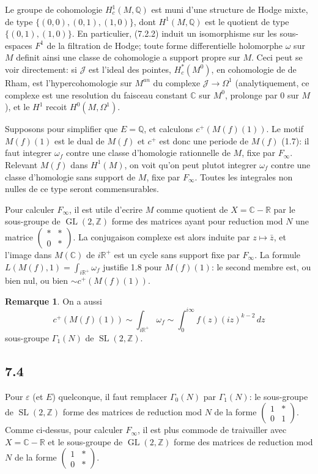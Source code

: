 \documentclass[12pt,a4paper]{article}
\theoremstyle{plain}
\theoremstyle{definition}
\newtheorem{remark}[definition]{Remarque}
\theoremstyle{remark}
\DeclareMathOperator{\GL}{GL}
\DeclareMathOperator{\SL}{SL}
\newcommand{\Q}{\mathbb{Q}}
\newcommand{\R}{\mathbb{R}}
\newcommand{\C}{\mathbb{C}}
\newcommand{\Z}{\mathbb{Z}}
\begin{document}
Le groupe de cohomologie $H^1_c(M, \Q)$ est muni d'une structure de Hodge mixte,
de type $\{(0,0), (0,1), (1,0)\}$, dont $H^1(M, \Q)$ est le quotient de type
$\{(0,1), (1,0)\}$. En particulier, (7.2.2) induit un isomorphisme sur les sous-espaces
$F^1$ de la filtration de Hodge; toute forme differentielle holomorphe $\omega$ sur $M$ definit
ainsi une classe de cohomologie a support propre sur $M$. Ceci peut se voir
directement: si $\mathcal{J}$ est l'ideal des pointes, $H_c^*(M^0)$, en cohomologie de de Rham,
est l'hypercohomologie sur $M^{an}$ du complexe $\mathcal{J} \to \Omega^1$ (analytiquement, ce complexe
est une resolution du faisceau constant $\C$ sur $M^0$, prolonge par 0 sur $M$), et le
$H^1$ recoit $H^0(M, \Omega^1)$.

Supposons pour simplifier que $E = \Q$, et calculons $c^+(M(f)(1))$. Le motif $M(f)(1)$
est le dual de $M(f)$ et $c^+$ est donc une periode de $M(f)$ (1.7): il faut integrer
$\omega_f$ contre une classe d'homologie rationnelle de $M$, fixe par $F_\infty$. Relevant
$M(f)$ dans $H^1(M)$, on voit qu'on peut plutot integrer $\omega_f$ contre une classe
d'homologie sans support de $M$, fixe par $F_\infty$. Toutes les integrales non nulles de
ce type seront commensurables.

Pour calculer $F_\infty$, il est utile d'ecrire $M$ comme quotient de
$X = \C - \R$ par le sous-groupe de $\GL(2, \Z)$ forme des matrices ayant pour
reduction mod $N$ une matrice $\begin{pmatrix} * & * \\ 0 & * \end{pmatrix}$. La conjugaison
complexe est alors induite par $z \mapsto \bar{z}$, et l'image dans $M(\C)$ de $i\R^+$ est
un cycle sans support fixe par $F_\infty$. La formule $L(M(f), 1) = \int_{i\R^+} \omega_f$
justifie 1.8 pour $M(f)(1)$: le second membre est, ou bien nul, ou bien $\sim c^+(M(f)(1))$.

\begin{remark}
On a aussi
\[
c^+(M(f)(1)) \sim \int_{i\R^+} \omega_f \sim \int_0^{i\infty} f(z) (iz)^{k-2} \, dz
\]
sous-groupe $\Gamma_1(N)$ de $\SL(2, \Z)$.
\end{remark}

\subsection*{7.4}

Pour $\varepsilon$ (et $E$) quelconque, il faut remplacer $\Gamma_0(N)$ par $\Gamma_1(N)$: le sous-groupe
de $\SL(2, \Z)$ forme des matrices de reduction mod $N$ de la forme
$\begin{pmatrix} 1 & * \\ 0 & 1 \end{pmatrix}$. Comme ci-dessus, pour calculer $F_\infty$, il est plus commode de
traivailler avec $X = \C - \R$ et le sous-groupe de $\GL(2, \Z)$ forme des matrices
de reduction mod $N$ de la forme $\begin{pmatrix} 1 & * \\ 0 & * \end{pmatrix}$.
\end{document}

